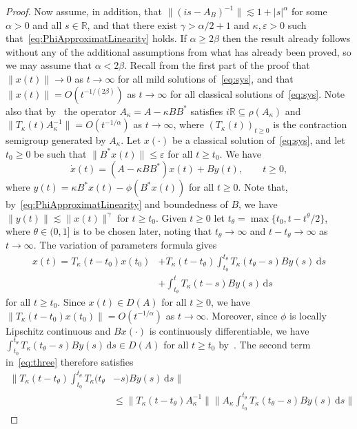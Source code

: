 \documentclass[11pt, a4paper]{amsart}
\newcommand{\dd}{\mathrm{d}}
\newcommand{\ep}{\varepsilon}
\newcommand{\RR}{\mathbb{R}}
\newcommand{\inv}{^{-1}}
\theoremstyle{definition}
\numberwithin{equation}{section}
\begin{document}
\begin{proof}
Now assume, in addition, that
$\|(is-A_B)\inv\|\lesssim 1+|s|^\alpha$ for some $\alpha>0$ and all $s\in\RR$, and that
 there exist $\gamma>\alpha/2+1$ and $\kappa,\ep>0$ such that~\eqref{eq:PhiApproximatLinearity} holds. If $\alpha\ge 2\beta$ then the result already follows without any of the additional assumptions from what has already been proved, so we may assume that $\alpha<2\beta$. Recall from the first part of the proof that $\|x(t)\|\to0$ as $t\to\infty$ for all  mild solutions of~\eqref{eq:sys}, and that $\|x(t)\|=O(t^{-1/(2\beta)})$ as $t\to\infty$ for all classical solutions of~\eqref{eq:sys}. Note also that by~\cite[Lem.~2.11(c)]{ChiPau23} the operator $A_\kappa = A-\kappa BB^\ast$ satisfies $i\RR\subseteq\rho(A_\kappa)$ and $\|T_\kappa(t)A_\kappa\inv\|=O(t^{-1/\alpha})$ as $t\to\infty$, where $(T_\kappa(t))_{t\ge0}$ is the contraction semigroup  generated by $A_\kappa$. Let $x(\cdot)$ be a classical solution of~\eqref{eq:sys}, and let $t_0\ge0$ be such that $\|B^*x(t)\|\le\ep$ for all $t\ge t_0$.  We have
 $$\dot{x}(t)=(A-\kappa BB^\ast) x(t) + By(t),\qquad t\ge 0,$$
 where $y(t)=\kappa B^\ast x(t)-\phi(B^\ast x(t))$ for all $t\ge 0$. Note that, by~\eqref{eq:PhiApproximatLinearity} and boundedness of $B$, we have $\|y(t)\|\lesssim \| x(t)\|^{\gamma}$ for $t\ge t_0$. Given $t\ge0$ let $t_\theta=\max\{t_0,t-t^\theta/2\}$, where $\theta\in(0,1]$ is to be chosen later, noting that $t_\theta\to\infty$ and $t-t_\theta\to\infty$ as $t\to\infty$. The variation of parameters formula gives
 \begin{equation}\label{eq:three}
 \begin{aligned}
 x(t)
 = T_\kappa (t-t_0)x(t_0) 
&+ T_\kappa (t-t_\theta)\int_{t_0}^{t_\theta} T_\kappa (t_\theta-s)By(s)\,\dd s\\
\qquad &+ \int_{t_\theta}^t T_\kappa (t-s)By(s)\,\dd s
 \end{aligned}
 \end{equation}
for all $t\ge t_0$.  Since $x(t)\in D(A)$ for all $t\ge 0$, we have  $\|T_\kappa (t-t_0)x(t_0)\| =O(  t^{-1/\alpha})$ as $t\to\infty$. 
 Moreover, since $\phi$ is locally Lipschitz continuous and $Bx(\cdot)$ is continuously differentiable, we have $\int_{t_0}^{t_\theta} T_\kappa (t_\theta-s)By(s)\,\dd s\in D(A)$ for all $t\ge t_0$ by~\cite[Cor.~3.1.17]{AreBat11book}.
The second term in~\eqref{eq:three} therefore satisfies
$$\begin{aligned}
\bigg\|T_\kappa (t-t_\theta)\int_{t_0}^{t_\theta} T_\kappa (t_\theta&-s)By(s)\,\dd s\bigg\|\\ &\le\|T_\kappa (t-t_\theta)A_\kappa\inv\|\bigg\|A_\kappa\int_{t_0}^{t_\theta} T_\kappa (t_\theta-s)By(s)\,\dd s\bigg\|

\end{aligned}$$
\end{proof}
\end{document}
